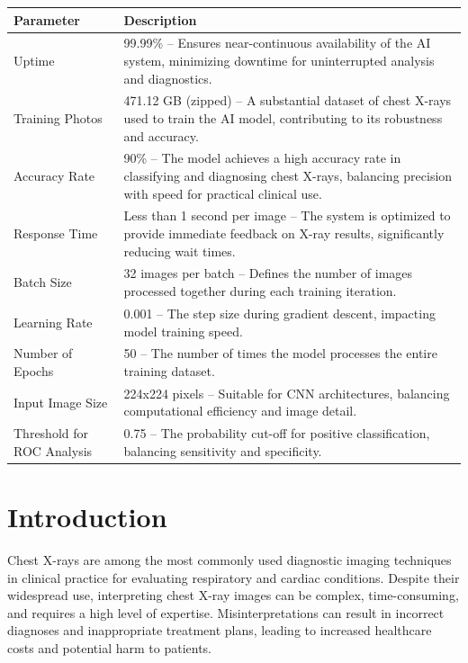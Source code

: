 \documentclass[12pt]{article}
\begin{document}
\renewcommand{\arraystretch}{1.3}
\noindent \begin{tabular}{|p{3.5cm}|p{9.5cm}|}
    \hline
    \rowcolor{lightgray} \textbf{Parameter} & \textbf{Description} \\
    \hline
    Uptime & 99.99\% – Ensures near-continuous availability of the AI system, minimizing downtime for uninterrupted analysis and diagnostics. \\
    \hline
    Training Photos & 471.12 GB (zipped) – A substantial dataset of chest X-rays used to train the AI model, contributing to its robustness and accuracy. \\
    \hline
    Accuracy Rate & 90\% – The model achieves a high accuracy rate in classifying and diagnosing chest X-rays, balancing precision with speed for practical clinical use. \\
    \hline
    Response Time & Less than 1 second per image – The system is optimized to provide immediate feedback on X-ray results, significantly reducing wait times. \\
    \hline
    Batch Size & 32 images per batch – Defines the number of images processed together during each training iteration. \\
    \hline
    Learning Rate & 0.001 – The step size during gradient descent, impacting model training speed. \\
    \hline
    Number of Epochs & 50 – The number of times the model processes the entire training dataset. \\
    \hline
    Input Image Size & 224x224 pixels – Suitable for CNN architectures, balancing computational efficiency and image detail. \\
    \hline
    Threshold for ROC Analysis & 0.75 – The probability cut-off for positive classification, balancing sensitivity and specificity. \\
    \hline
\end{tabular}


\newpage

\section{Introduction}

Chest X-rays are among the most commonly used diagnostic imaging techniques in clinical practice for evaluating respiratory and cardiac conditions. Despite their widespread use, interpreting chest X-ray images can be complex, time-consuming, and requires a high level of expertise. Misinterpretations can result in incorrect diagnoses and inappropriate treatment plans, leading to increased healthcare costs and potential harm to patients.
\end{document}

